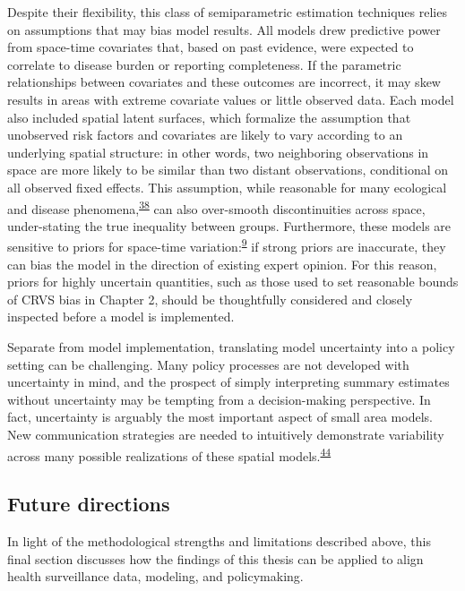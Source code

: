 \documentclass[
]{article}
\begin{document}
Despite their flexibility, this class of semiparametric estimation techniques relies on assumptions that may bias model results. All models drew predictive power from space-time covariates that, based on past evidence, were expected to correlate to disease burden or reporting completeness. If the parametric relationships between covariates and these outcomes are incorrect, it may skew results in areas with extreme covariate values or little observed data. Each model also included spatial latent surfaces, which formalize the assumption that unobserved risk factors and covariates are likely to vary according to an underlying spatial structure: in other words, two neighboring observations in space are more likely to be similar than two distant observations, conditional on all observed fixed effects. This assumption, while reasonable for many ecological and disease phenomena,\textsuperscript{\protect\hyperlink{ref-Diggle2016}{38}} can also over-smooth discontinuities across space, under-stating the true inequality between groups. Furthermore, these models are sensitive to priors for space-time variation:\textsuperscript{\protect\hyperlink{ref-Wakefield2019}{9}} if strong priors are inaccurate, they can bias the model in the direction of existing expert opinion. For this reason, priors for highly uncertain quantities, such as those used to set reasonable bounds of CRVS bias in Chapter 2, should be thoughtfully considered and closely inspected before a model is implemented.

Separate from model implementation, translating model uncertainty into a policy setting can be challenging. Many policy processes are not developed with uncertainty in mind, and the prospect of simply interpreting summary estimates without uncertainty may be tempting from a decision-making perspective. In fact, uncertainty is arguably the most important aspect of small area models. New communication strategies are needed to intuitively demonstrate variability across many possible realizations of these spatial models.\textsuperscript{\protect\hyperlink{ref-Patil2011}{44}}

\hypertarget{future-directions}{%
\subsection{Future directions}\label{future-directions}}

In light of the methodological strengths and limitations described above, this final section discusses how the findings of this thesis can be applied to align health surveillance data, modeling, and policymaking.
\end{document}
